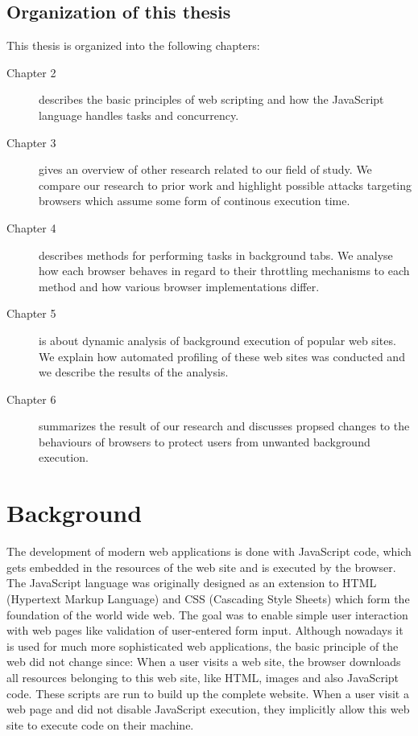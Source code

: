 \documentclass[
	ruledheaders=section,%
	class=report,%
	thesis={type=bachelor},%
	accentcolor=9c,%
	custommargins=true,%
	marginpar=false,%
	parskip=half-,%
	fontsize=11pt,%
]{tudapub}
\begin{document}
  \section{Organization of this thesis}

  This thesis is organized into the following chapters:

  \begin{description}
  \item[Chapter 2] describes the basic principles of web scripting and how the JavaScript language handles tasks and concurrency.
    
  \item[Chapter 3] gives an overview of other research related to our field of study. We compare our research to prior work and highlight possible attacks targeting browsers which assume some form of continous execution time.
    
  \item[Chapter 4] describes methods for performing tasks in background tabs. We analyse how each browser behaves in regard to their throttling mechanisms to each method and how various browser implementations differ.
    
  \item[Chapter 5] is about dynamic analysis of background execution of popular web sites. We explain how automated profiling of these web sites was conducted and we describe the results of the analysis.
    
  \item[Chapter 6] summarizes the result of our research and discusses propsed changes to the behaviours of browsers to protect users from unwanted background execution.
  \end{description} 

  
  \newpage
  \chapter{Background}
  
  The development of modern web applications is done with JavaScript code, which gets embedded in the resources of the web site and is executed by the browser. The JavaScript language was originally designed as an extension to HTML (Hypertext Markup Language) and CSS (Cascading Style Sheets) which form the foundation of the world wide web. The goal was to enable simple user interaction with web pages like validation of user-entered form input. Although nowadays it is used for much more sophisticated web applications, the basic principle of the web did not change since: When a user visits a web site, the browser downloads all resources belonging to this web site, like HTML, images and also JavaScript code. These scripts are run to build up the complete website. When a user visit a web page and did not disable JavaScript execution, they implicitly allow this web site to execute code on their machine.
\end{document}
